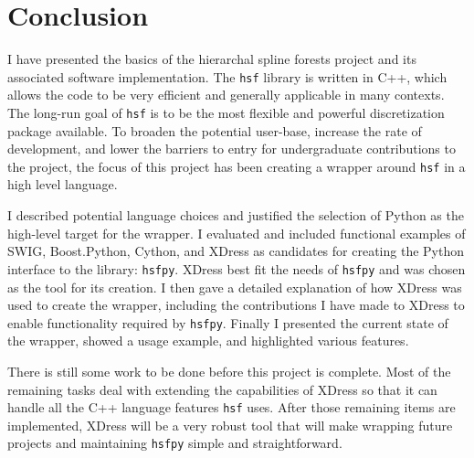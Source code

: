 \section{Conclusion} \label{sec:conclusion}


  I have presented the basics of the hierarchal spline forests project and its associated software implementation. The \texttt{hsf} library is written in C++, which allows the code to be very efficient and generally applicable in many contexts. The long-run goal of \texttt{hsf} is to be the most flexible and powerful discretization package available. To broaden the potential user-base, increase the rate of development, and lower the barriers to entry for undergraduate contributions to the project, the focus of this project has been creating a wrapper around \texttt{hsf} in a high level language.

  I described potential language choices and justified the selection of Python as the high-level target for the wrapper. I evaluated and included functional examples of SWIG, Boost.Python, Cython, and XDress as candidates for creating the Python interface to the library: \texttt{hsfpy}. XDress best fit the needs of \texttt{hsfpy} and was chosen as the tool for its creation. I then gave a detailed explanation of how XDress was used to create the wrapper, including the contributions I have made to XDress to enable functionality required by \texttt{hsfpy}. Finally I presented the current state of the wrapper, showed a usage example, and highlighted various features.

  There is still some work to be done before this project is complete. Most of the remaining tasks deal with extending the capabilities of XDress so that it can handle all the C++ language features \texttt{hsf} uses. After those remaining items are implemented, XDress will be a very robust tool that will make wrapping future projects and maintaining \texttt{hsfpy} simple and straightforward.

